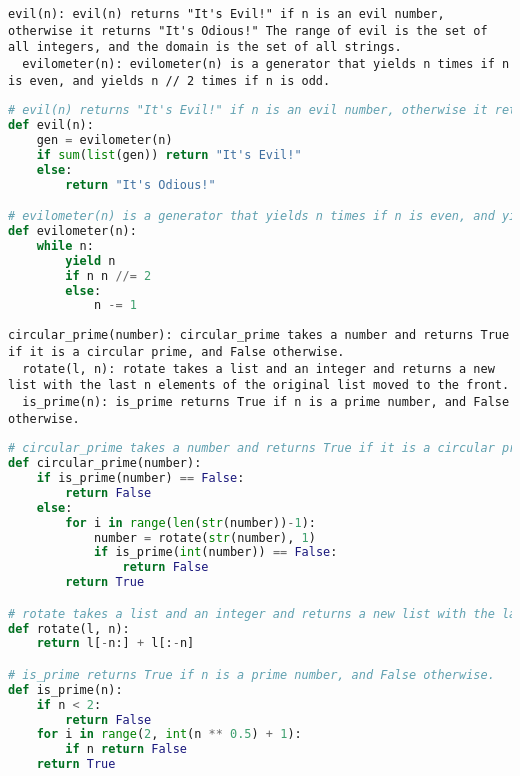 \begin{figure*}
\begin{lstlisting}
evil(n): evil(n) returns "It's Evil!" if n is an evil number, otherwise it returns "It's Odious!" The range of evil is the set of all integers, and the domain is the set of all strings.
  evilometer(n): evilometer(n) is a generator that yields n times if n is even, and yields n // 2 times if n is odd.
\end{lstlisting}
\caption{Train Problem 3321, Solution 33}
\end{figure*}

\begin{figure*}
\begin{lstlisting}[language=Python]
# evil(n) returns "It's Evil!" if n is an evil number, otherwise it returns "It's Odious!" The range of evil is the set of all integers, and the domain is the set of all strings.
def evil(n):
    gen = evilometer(n)
    if sum(list(gen)) return "It's Evil!"
    else:
        return "It's Odious!"

# evilometer(n) is a generator that yields n times if n is even, and yields n // 2 times if n is odd.
def evilometer(n):
    while n:
        yield n
        if n n //= 2
        else:
            n -= 1
\end{lstlisting}
\caption{Train Problem 3321, Solution 33}
\end{figure*}

\begin{figure*}
\begin{lstlisting}
circular_prime(number): circular_prime takes a number and returns True if it is a circular prime, and False otherwise.
  rotate(l, n): rotate takes a list and an integer and returns a new list with the last n elements of the original list moved to the front.
  is_prime(n): is_prime returns True if n is a prime number, and False otherwise.
\end{lstlisting}
\caption{Train Problem 3368, Solution 5}
\end{figure*}

\begin{figure*}
\begin{lstlisting}[language=Python]
# circular_prime takes a number and returns True if it is a circular prime, and False otherwise.
def circular_prime(number):
    if is_prime(number) == False:
        return False
    else:
        for i in range(len(str(number))-1):
            number = rotate(str(number), 1)
            if is_prime(int(number)) == False:
                return False
        return True

# rotate takes a list and an integer and returns a new list with the last n elements of the original list moved to the front.
def rotate(l, n):
    return l[-n:] + l[:-n]

# is_prime returns True if n is a prime number, and False otherwise.
def is_prime(n):
    if n < 2:
        return False
    for i in range(2, int(n ** 0.5) + 1):
        if n return False
    return True
\end{lstlisting}
\caption{Train Problem 3368, Solution 5}
\end{figure*}


